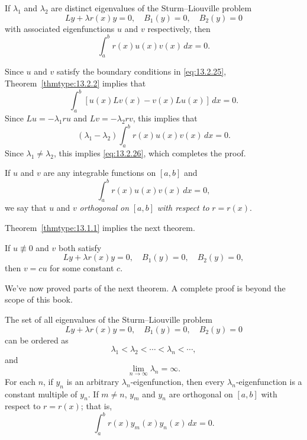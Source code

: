 \begin{theorem}
  \color{blue}
  \label{thmtype:13.2.4} If $\lambda_{1}$ and $\lambda_{2}$ are distinct eigenvalues of the
  Sturm--Liouville problem
  \begin{equation}
    \label{eq:13.2.25}Ly+\lambda r(x)y=0,\quad B_{1}(y)=0,\quad B_{2}(y)=0
  \end{equation}
  with associated eigenfunctions $u$ and $v$ respectively, then
  \begin{equation}
    \label{eq:13.2.26}\int_{a}^{b}r(x)u(x)v(x)\,dx=0.
  \end{equation}
\end{theorem}

\proof Since $u$ and $v$ satisfy the boundary conditions in \eqref{eq:13.2.25},
Theorem~\ref{thmtype:13.2.2} implies that
\[
  \int_{a}^{b}[u(x)Lv(x)-v(x)Lu(x)]\,dx=0.
\]
Since $Lu=-\lambda_{1}ru$ and $Lv=-\lambda_{2}rv$, this implies that
\[
  (\lambda_{1}-\lambda_{2})\int_{a}^{b}r(x)u(x)v(x)\,dx=0.
\]
Since $\lambda_{1}\ne\lambda_{2}$, this implies \eqref{eq:13.2.26}, which completes the proof.

If $u$ and $v$ are any integrable functions on $[a,b]$ and
\[
  \int_{a}^{b}r(x)u(x)v(x)\,dx=0,
\]
we say that $u$ and $v$ \emph{orthogonal on} $[a,b]$ \emph{with respect to} $r=r(x)$.

Theorem~\ref{thmtype:13.1.1} implies the next theorem.

\begin{theorem}
  \color{blue}
  \label{thmtype:13.2.5} If $u\not\equiv0$ and $v$ both satisfy
  \[
    Ly+\lambda r(x)y=0,\quad B_{1}(y)=0,\quad B_{2}(y)=0,
  \]
  then $v=cu$ for some constant $c$.
\end{theorem}

We've now proved parts of the next theorem. A complete proof is beyond the scope of this book.

\begin{theorem}
  \color{blue}
  \label{thmtype:13.2.6} The set of all eigenvalues of the Sturm--Liouville problem
  \[
    Ly+\lambda r(x)y=0,\quad B_{1}(y)=0,\quad B_{2}(y)=0
  \]
  can be ordered as
  \[
    \lambda_{1}<\lambda_{2}<\cdots<\lambda_{n}<\cdots,
  \]
  and
  \[
    \lim_{n\to\infty}\lambda_{n}=\infty.
  \]
  For each $n$, if $y_{n}$ is an arbitrary $\lambda_{n}$-eigenfunction, then every
  $\lambda_{n}$-eigenfunction is a constant multiple of $y_{n}$. If $m\ne n$, $y_{m}$ and $y_{n}$
  are orthogonal on $[a,b]$ with respect to $r=r(x)$; that is,
  \begin{equation}
    \label{eq:13.2.27}\int_{a}^{b}r(x)y_{m}(x)y_{n}(x)\,dx=0.
  \end{equation}
\end{theorem}

